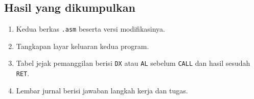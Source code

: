 \subsection{Hasil yang dikumpulkan}

\begin{enumerate}
    \item Kedua berkas \texttt{.asm} beserta versi modifikasinya.
    \item Tangkapan layar keluaran kedua program.
    \item Tabel jejak pemanggilan berisi \texttt{DX} atau \texttt{AL}
          sebelum \texttt{CALL} dan hasil sesudah \texttt{RET}.
    \item Lembar jurnal berisi jawaban langkah kerja dan tugas.
\end{enumerate}
